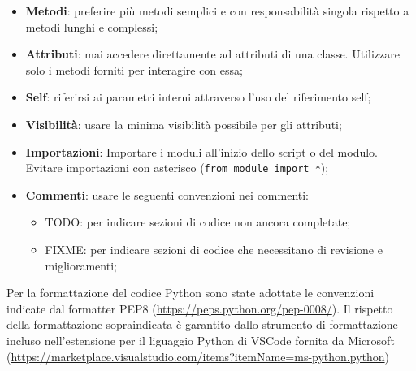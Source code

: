 \documentclass[10pt, a4paper]{article}
\begin{document}
\begin{itemize}
    \item \textbf{Metodi}: preferire più metodi semplici e con responsabilità singola rispetto a metodi lunghi e complessi;
    \item \textbf{Attributi}: mai accedere direttamente ad attributi di una classe. Utilizzare solo i metodi forniti per interagire con essa;
    \item \textbf{Self}: riferirsi ai parametri interni attraverso l'uso del riferimento self;
    \item \textbf{Visibilità}: usare la minima visibilità possibile per gli attributi;
    \item \textbf{Importazioni}: Importare i moduli all'inizio dello script o del modulo. Evitare importazioni con asterisco (\texttt{from module import *});
    \item \textbf{Commenti}: usare le seguenti convenzioni nei commenti:
        \begin{itemize}
            \item TODO: per indicare sezioni di codice non ancora completate;
            \item FIXME: per indicare sezioni di codice che necessitano di revisione e miglioramenti;
        \end{itemize}
\end{itemize}
Per la formattazione del codice Python sono state adottate le convenzioni indicate dal formatter PEP8 (\url{https://peps.python.org/pep-0008/}).
Il rispetto della formattazione sopraindicata è garantito dallo strumento di formattazione incluso nell'estensione per il liguaggio Python di VSCode fornita da Microsoft (\url{https://marketplace.visualstudio.com/items?itemName=ms-python.python})
\end{document}
